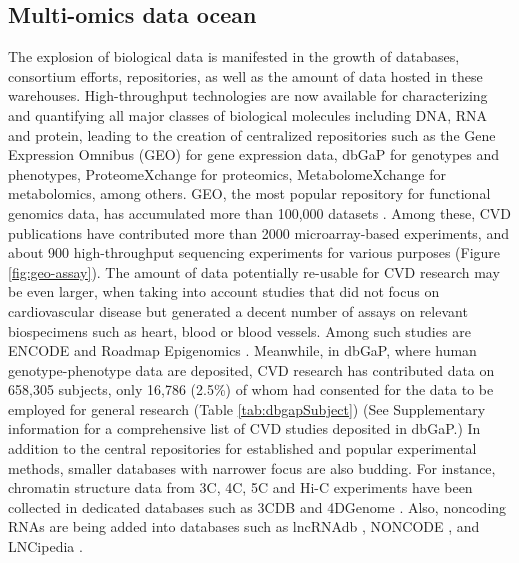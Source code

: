 \documentclass[letter]{bioinfo}
\begin{document}
	\subsection*{Multi-omics data ocean}
    The explosion of biological data is manifested in the growth of databases, consortium efforts, repositories, as well as the amount of data hosted in these warehouses. High-throughput technologies are now available for characterizing and quantifying all major classes of biological molecules including DNA, RNA and protein, leading to the creation of centralized repositories such as the Gene Expression Omnibus (GEO) \citep{Barrett:2013:NCBI} for gene expression data, dbGaP \citep{Tryka:2014:dbGaP} for genotypes and phenotypes, ProteomeXchange \citep{Vizcaino:2014:ProteomeXchange,Deutsch:2017:ProteomeXchange} for proteomics, MetabolomeXchange for metabolomics, among others.  GEO, the most popular repository for functional genomics data, has accumulated more than 100,000 datasets \citep{Zhu:2008:GEOmetadb}. Among these, CVD publications have contributed more than 2000 microarray-based experiments, and about 900 high-throughput sequencing experiments for various purposes (Figure \ref{fig:geo-assay}). The amount of data potentially re-usable for CVD research may be even larger, when taking into account studies that did not focus on cardiovascular disease but generated a decent number of assays on relevant biospecimens such as heart, blood or blood vessels. Among such studies are ENCODE \citep{ENCODE:2012:integrated} and Roadmap Epigenomics \citep{Roadmap:2015:Integrative}.
	Meanwhile, in dbGaP, where human genotype-phenotype data are deposited, CVD research has contributed data on 658,305 subjects, only 16,786 (2.5\%) of whom had consented for the data to be employed for general research (Table \ref{tab:dbgapSubject}) (See Supplementary information for a comprehensive list of CVD studies deposited in dbGaP.)
	In addition to the central repositories for established and popular experimental methods, smaller databases with narrower focus are also budding. For instance, chromatin structure data from 3C, 4C, 5C and Hi-C experiments have been collected in dedicated databases such as 3CDB \citep{Yun:2016:3CDB} and 4DGenome \citep{Teng:2015:4DGenome}. Also, noncoding RNAs are being added into databases such as lncRNAdb \citep{Quek:2015:lncRNAdb}, NONCODE \citep{Fang:2018:NONCODEV5}, and LNCipedia \citep{Volders:2018:LNCipedia}.
	
\end{document}
